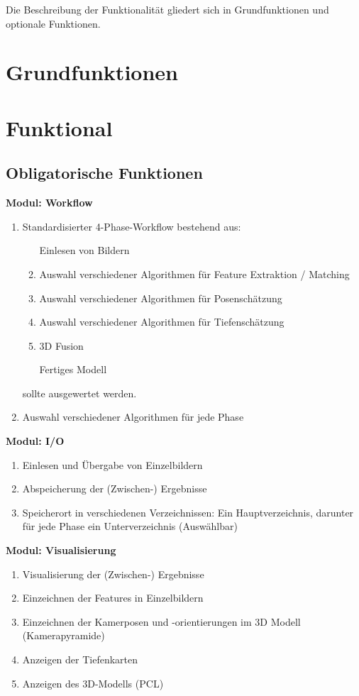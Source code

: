 
Die Beschreibung der Funktionalität gliedert sich in Grundfunktionen und optionale Funktionen.

\section{Grundfunktionen}
\section{Funktional}
\subsection{Obligatorische Funktionen}
\textbf{Modul: Workflow}
\begin{enumerate}[ align=left, label={\textbf{\textbackslash FM1\arabic*0\textbackslash}} ]
	\item Standardisierter 4-Phase-Workflow bestehend aus:
\begin{enumerate}[ align=left, label={\textbf{\arabic*}} ]
	\item [Einlesen von Bildern]
	\item Auswahl verschiedener Algorithmen für Feature Extraktion / Matching
	\item Auswahl verschiedener Algorithmen für Posenschätzung
	\item Auswahl verschiedener Algorithmen für Tiefenschätzung
	\item 3D Fusion
	\item [Fertiges Modell]
	\end{enumerate}
	sollte ausgewertet werden.
	\item Auswahl verschiedener Algorithmen für jede Phase
\end{enumerate}
\textbf{Modul: I/O}
\begin{enumerate}[ align=left, label={\textbf{\textbackslash FM2\arabic*0\textbackslash}} ]
	\item Einlesen und Übergabe von Einzelbildern
	\item Abspeicherung der (Zwischen-) Ergebnisse
	\item Speicherort in verschiedenen Verzeichnissen: Ein Hauptverzeichnis, darunter für jede Phase
	ein Unterverzeichnis (Auswählbar)
\end{enumerate}
\textbf{Modul: Visualisierung}
\begin{enumerate}[ align=left, label={\textbf{\textbackslash FM3\arabic*0\textbackslash}} ]
	\item Visualisierung der (Zwischen-) Ergebnisse
	\item Einzeichnen der Features in Einzelbildern
	\item Einzeichnen der Kamerposen und -orientierungen im 3D Modell (Kamerapyramide)
	\item Anzeigen der Tiefenkarten
	\item Anzeigen des 3D-Modells (PCL)
\end{enumerate}
